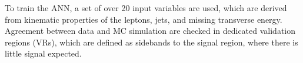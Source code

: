 To train the ANN, a set of over 20 input variables are used, which are derived from kinematic properties of the leptons, jets, and missing transverse energy. Agreement between data and MC simulation are checked in dedicated validation regions (VRs), which are defined as sidebands to the signal region, where there is little signal expected.
